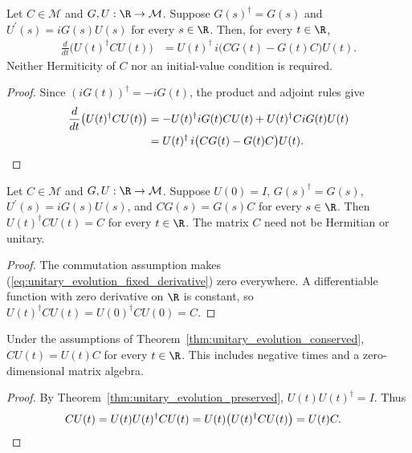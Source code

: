 \begin{theorem}
    \label{thm:unitary_evolution_fixed_derivative}
    \leanok
    Let $C\in\mathcal M$ and $G,U:\R\to\mathcal M$. Suppose
    $G(s)^\dagger=G(s)$ and $U^{\prime}(s)=iG(s)U(s)$ for every
    $s\in\R$. Then, for every $t\in\R$,
    \begin{align}
        \frac{d}{dt}\bigl(U(t)^\dagger C U(t)\bigr)
            &=U(t)^\dagger\,i\bigl(CG(t)-G(t)C\bigr)U(t).
        \label{eq:unitary_evolution_fixed_derivative}
    \end{align}
    Neither Hermiticity of $C$ nor an initial-value condition is required.
\end{theorem}
\begin{proof}\leanok
    Since $(iG(t))^\dagger=-iG(t)$, the product and adjoint rules give
    \begin{align}
        \frac{d}{dt}\bigl(U(t)^\dagger C U(t)\bigr)
            &=-U(t)^\dagger iG(t)CU(t)+U(t)^\dagger CiG(t)U(t)\notag\\
            &=U(t)^\dagger\,i\bigl(CG(t)-G(t)C\bigr)U(t).\notag
    \end{align}
\end{proof}

\begin{theorem}
    \label{thm:unitary_evolution_conserved}
    \leanok
    Let $C\in\mathcal M$ and $G,U:\R\to\mathcal M$. Suppose
    $U(0)=I$, $G(s)^\dagger=G(s)$, $U^{\prime}(s)=iG(s)U(s)$,
    and $CG(s)=G(s)C$ for every $s\in\R$. Then
    $U(t)^\dagger C U(t)=C$ for every $t\in\R$.
    The matrix $C$ need not be Hermitian or unitary.
\end{theorem}
\begin{proof}\leanok
    The commutation assumption makes
    (\ref{eq:unitary_evolution_fixed_derivative}) zero everywhere.
    A differentiable function with zero derivative on $\R$ is constant,
    so $U(t)^\dagger C U(t)=U(0)^\dagger C U(0)=C$.
\end{proof}

\begin{theorem}
    \label{thm:unitary_evolution_commutes}
    \leanok
    Under the assumptions of Theorem~\ref{thm:unitary_evolution_conserved},
    $CU(t)=U(t)C$ for every $t\in\R$.
    This includes negative times and a zero-dimensional matrix algebra.
\end{theorem}
\begin{proof}\leanok
    By Theorem~\ref{thm:unitary_evolution_preserved},
    $U(t)U(t)^\dagger=I$. Thus
    \begin{align}
        CU(t)&=U(t)U(t)^\dagger CU(t)
            =U(t)\bigl(U(t)^\dagger CU(t)\bigr)=U(t)C.\notag
    \end{align}
\end{proof}

